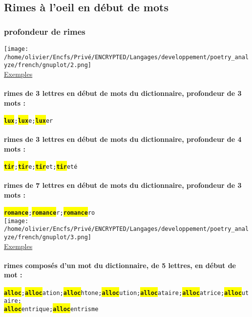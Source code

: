 \documentclass[french]{article}
\begin{document}
\subsection{Rimes à l'oeil en début de mots}
\subsubsection{profondeur de rimes}
\texttt{[image: /home/olivier/Encfs/Privé/ENCRYPTED/Langages/developpement/poetry\_analyze/french/gnuplot/2.png]}\\
\underline{Exemples}\\
\paragraph{rimes de 3 lettres en début de mots du dictionnaire, profondeur de 3 mots :\\}
\texttt{\colorbox{yellow}{\textbf{lux}};\colorbox{yellow}{\textbf{lux}}e;\colorbox{yellow}{\textbf{lux}}er}\\
\paragraph{rimes de 3 lettres en début de mots du dictionnaire, profondeur de 4 mots :\\}
\texttt{\colorbox{yellow}{\textbf{tir}};\colorbox{yellow}{\textbf{tir}}e;\colorbox{yellow}{\textbf{tir}}et;\colorbox{yellow}{\textbf{tir}}eté}\\
\paragraph{rimes de 7 lettres en début de mots du dictionnaire, profondeur de 3 mots :\\}
\texttt{\colorbox{yellow}{\textbf{romance}};\colorbox{yellow}{\textbf{romance}}r;\colorbox{yellow}{\textbf{romance}}ro}\\
\newpage
\texttt{[image: /home/olivier/Encfs/Privé/ENCRYPTED/Langages/developpement/poetry\_analyze/french/gnuplot/3.png]}\\
\underline{Exemples}\\
\paragraph{rimes composés d'un mot du dictionnaire, de 5 lettres, en début de mot :\\}
\texttt{\colorbox{yellow}{\textbf{alloc}};\colorbox{yellow}{\textbf{alloc}}ation;\colorbox{yellow}{\textbf{alloc}}htone;\colorbox{yellow}{\textbf{alloc}}ution;\colorbox{yellow}{\textbf{alloc}}ataire;\colorbox{yellow}{\textbf{alloc}}atrice;\colorbox{yellow}{\textbf{alloc}}utaire;}\\
\texttt{\colorbox{yellow}{\textbf{alloc}}entrique;\colorbox{yellow}{\textbf{alloc}}entrisme}\\
\end{document}
